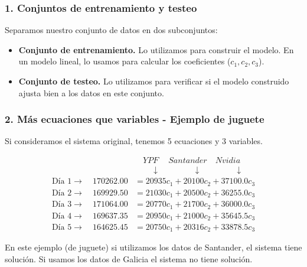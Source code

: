 \documentclass[aspectratio=169,12pt]{beamer}
\begin{document}

\begin{frame}
\frametitle{1. Conjuntos de entrenamiento y testeo}

Separamos nuestro conjunto de datos en dos subconjuntos:
\begin{itemize}
\item \textbf{Conjunto de entrenamiento.} Lo utilizamos para construir el modelo. En un modelo lineal, lo usamos para calcular los coeficientes
    ($c_1, c_2, c_3$).
\item \textbf{Conjunto de testeo.} Lo utilizamos para verificar si el modelo construido ajusta bien a los datos en este conjunto.
\end{itemize}

\end{frame}



\begin{frame}
\frametitle{2. Más ecuaciones que variables - Ejemplo de juguete}

Si consideramos el sistema original, tenemos 5 ecuaciones y 3 variables.

\begin{align*}
& \quad YPF \quad \ Santander \quad Nvidia \\
& \quad \quad \downarrow \quad  \quad  \quad  \quad \downarrow  \quad  \quad \quad \quad \downarrow  \\
\text{D\'ia 1} \rightarrow \quad 170262.00	&= 20935	c_1 + 20100 c_2 + 37100.0 c_3 \\
\text{D\'ia 2} \rightarrow \quad 169929.50	&= 21030	c_1 + 20500 c_2 + 36255.0 c_3 \\
\text{D\'ia 3} \rightarrow \quad 171064.00	&= 20770	c_1 + 21700 c_2 + 36000.0 c_3 \\
\text{D\'ia 4} \rightarrow \quad 169637.35	&= 20950	c_1 + 21000 c_2 + 35645.5 c_3 \\
\text{D\'ia 5} \rightarrow \quad 164625.45	&= 20750	c_1 + 20316 c_2 + 33878.5 c_3
\end{align*}

En este ejemplo (de juguete) si utilizamos los datos de Santander, el sistema tiene solución.
Si usamos los datos de Galicia el sistema no tiene solución.

\end{frame}


\end{document}
